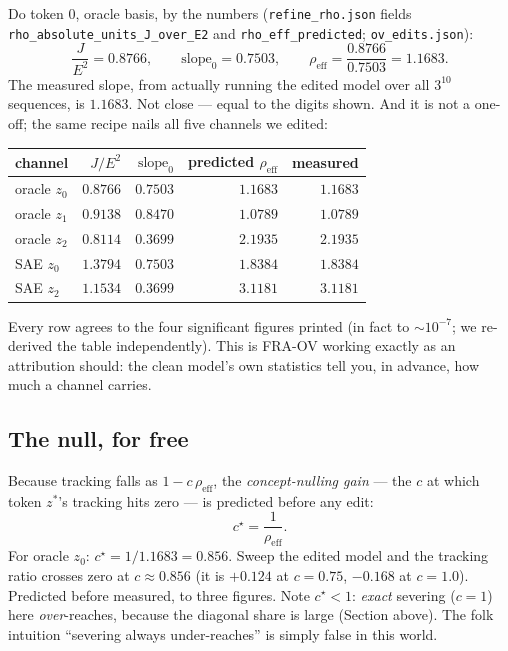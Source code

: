 \documentclass[11pt]{article}
\begin{document}
Do token $0$, oracle basis, by the numbers (\texttt{refine\_rho.json} fields
\texttt{rho\_absolute\_units\_J\_over\_E2} and \texttt{rho\_eff\_predicted};
\texttt{ov\_edits.json}):
\[
  \frac{J}{E^2}=0.8766,\qquad \text{slope}_0=0.7503,\qquad
  \rho_{\mathrm{eff}}=\frac{0.8766}{0.7503}=\mathbf{1.1683}.
\]
The measured slope, from actually running the edited model over all $3^{10}$
sequences, is $\mathbf{1.1683}$. Not close --- equal to the digits shown. And it
is not a one-off; the same recipe nails all five channels we edited:
\begin{center}
\begin{tabular}{lrrrr}
\toprule
channel & $J/E^2$ & $\text{slope}_0$ & predicted $\rho_{\mathrm{eff}}$ & measured \\
\midrule
oracle $z_0$ & $0.8766$ & $0.7503$ & $1.1683$ & $1.1683$ \\
oracle $z_1$ & $0.9138$ & $0.8470$ & $1.0789$ & $1.0789$ \\
oracle $z_2$ & $0.8114$ & $0.3699$ & $2.1935$ & $2.1935$ \\
SAE $z_0$    & $1.3794$ & $0.7503$ & $1.8384$ & $1.8384$ \\
SAE $z_2$    & $1.1534$ & $0.3699$ & $3.1181$ & $3.1181$ \\
\bottomrule
\end{tabular}
\end{center}
Every row agrees to the four significant figures printed (in fact to
$\sim10^{-7}$; we re-derived the table independently). This is FRA-OV working
exactly as an attribution should: the clean model's own statistics tell you, in
advance, how much a channel carries.

\subsection{The null, for free}

Because tracking falls as $1-c\,\rho_{\mathrm{eff}}$, the \emph{concept-nulling
gain} --- the $c$ at which token $z^*$'s tracking hits zero --- is predicted
before any edit:
\[
  c^\star=\frac{1}{\rho_{\mathrm{eff}}} .
\]
For oracle $z_0$: $c^\star=1/1.1683=\mathbf{0.856}$. Sweep the edited model and
the tracking ratio crosses zero at $c\approx0.856$ (it is $+0.124$ at $c=0.75$,
$-0.168$ at $c=1.0$). Predicted before measured, to three figures. Note
$c^\star<1$: \emph{exact} severing ($c=1$) here \emph{over}-reaches, because the
diagonal share is large (Section above). The folk intuition ``severing always
under-reaches'' is simply false in this world.
\end{document}
